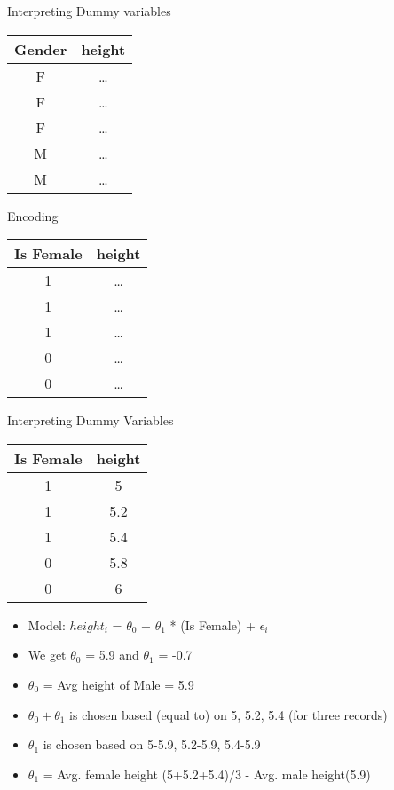 \documentclass{beamer}
\begin{document}
    \begin{frame}{Interpreting Dummy variables}
    \begin{center}
    \begin{tabular}{c|c}
    Gender& height\\
    \hline
    \hline
    F & \dots \\
    F & \dots \\
    F & \dots \\
    M & \dots \\
    M & \dots \\
    \end{tabular}
    
    \end{center}
    
    \pause Encoding
    
    \begin{center}
    \pause \begin{tabular}{c|c}
    Is Female& height\\
    \hline
    \hline
    1 & \dots \\
    1 & \dots \\
    1 & \dots \\
    0 & \dots \\
    0 & \dots \\
    \end{tabular}
    \end{center}
    
    \end{frame}
    
    \begin{frame}{Interpreting Dummy Variables}
    \begin{center}
        \pause \begin{tabular}{c|c}
            Is Female& height\\
            \hline
            \hline
            1 & 5 \\
            1 & 5.2 \\
            1 & 5.4 \\
            0 & 5.8 \\
            0 & 6 \\
        \end{tabular}
    \end{center}
    \begin{itemize}[<+->]
        \item Model: $height_{i}$ = $\theta_{0}$ + $\theta_{1}$ *  (Is Female) + $\epsilon_{i}$
        \item We get $\theta_0$ = 5.9 and $\theta_1$ = -0.7
        \item $\theta_{0}$ = Avg height of Male = 5.9
        \item $\theta_{0} + \theta_{1}$ is chosen based (equal to) on 5, 5.2, 5.4 (for three records)
        \item $\theta_{1}$ is chosen based on 5-5.9, 5.2-5.9, 5.4-5.9
        \item $\theta_{1}$ = Avg. female height (5+5.2+5.4)/3 - Avg. male height(5.9)
    \end{itemize}
    \end{frame}
    
\end{document}
